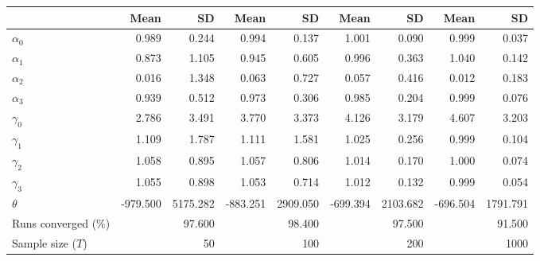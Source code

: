 
\begin{tabular}[t]{lrrrrrrrr}
\toprule
  & Mean & SD & Mean  & SD  & Mean   & SD   & Mean    & SD   \\
\midrule
$\alpha_{0}$ & 0.989 & 0.244 & 0.994 & 0.137 & 1.001 & 0.090 & 0.999 & 0.037\\
$\alpha_{1}$ & 0.873 & 1.105 & 0.945 & 0.605 & 0.996 & 0.363 & 1.040 & 0.142\\
$\alpha_{2}$ & 0.016 & 1.348 & 0.063 & 0.727 & 0.057 & 0.416 & 0.012 & 0.183\\
$\alpha_{3}$ & 0.939 & 0.512 & 0.973 & 0.306 & 0.985 & 0.204 & 0.999 & 0.076\\
$\gamma_{0}$ & 2.786 & 3.491 & 3.770 & 3.373 & 4.126 & 3.179 & 4.607 & 3.203\\
$\gamma_{1}$ & 1.109 & 1.787 & 1.111 & 1.581 & 1.025 & 0.256 & 0.999 & 0.104\\
$\gamma_{2}$ & 1.058 & 0.895 & 1.057 & 0.806 & 1.014 & 0.170 & 1.000 & 0.074\\
$\gamma_{3}$ & 1.055 & 0.898 & 1.053 & 0.714 & 1.012 & 0.132 & 0.999 & 0.054\\
$\theta$ & -979.500 & 5175.282 & -883.251 & 2909.050 & -699.394 & 2103.682 & -696.504 & 1791.791\\
Runs converged (\%) &  & 97.600 &  & 98.400 &  & 97.500 &  & 91.500\\
Sample size ($T$) &  & 50 &  & 100 &  & 200 &  & 1000\\
\bottomrule
\end{tabular}
